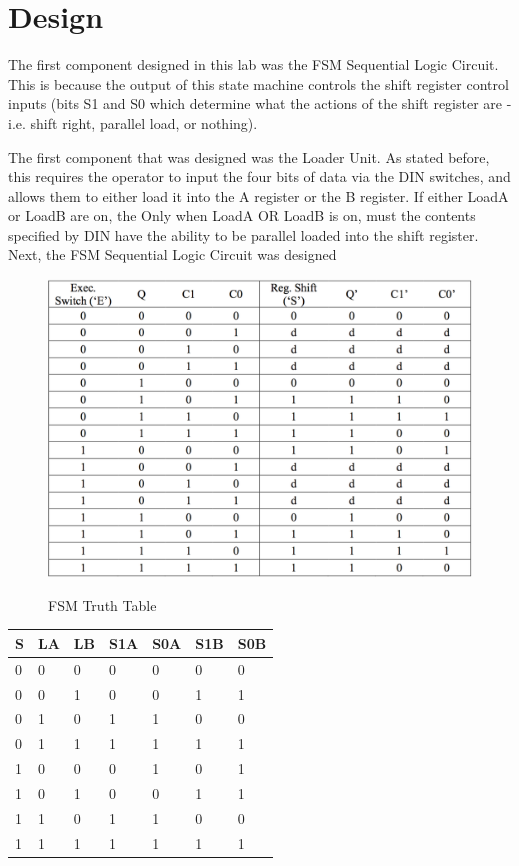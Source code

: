 \documentclass[journal, twocolumn, final,11pt,letterpaper]{IEEEtran}
\begin{document}
\section{Design}
The first component designed in this lab was the FSM Sequential Logic Circuit. This is because the output of this state machine controls the shift register control inputs (bits S1 and S0 which determine what the actions of the shift register are - i.e. shift right, parallel load, or nothing).

The first component that was designed was the Loader Unit. As stated before, this requires the operator to input the four bits of data via the DIN switches, and allows them to either load it into the A register or the B register. If either LoadA or LoadB are on, the  Only when LoadA OR LoadB is on, must the contents specified by DIN have the ability to be parallel loaded into the shift register. \\

Next, the FSM Sequential Logic Circuit was designed 



\begin{figure} [H]
	\centering
	\includegraphics[scale=0.33]{FSM_Truth_Table.png}
	\label{fig:fsm-truth-table}
	\caption{FSM Truth Table}
\end{figure}            

\begin{center}
	\begin{tabular}{lll|ll|ll}
		S & LA & LB & S1A & S0A & S1B & S0B\\ \hline
		0 & 0 & 0 & 0 & 0 & 0 & 0 \\
		0 & 0 & 1 & 0 & 0 & 1 & 1 \\
		0 & 1 & 0 & 1 & 1 & 0 & 0 \\
		0 & 1 & 1 & 1 & 1 & 1 & 1 \\
		1 & 0 & 0 & 0 & 1 & 0 & 1 \\
		1 & 0 & 1 & 0 & 0 & 1 & 1 \\
		1 & 1 & 0 & 1 & 1 & 0 & 0 \\
		1 & 1 & 1 & 1 & 1 & 1 & 1 \\
	\end{tabular}
\end{center}
\end{document}
